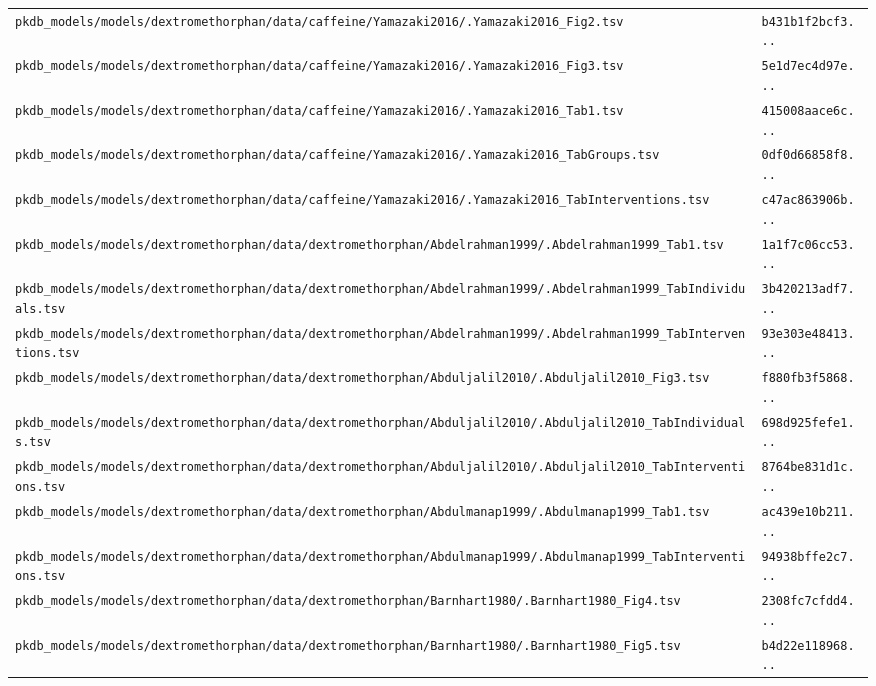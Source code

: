 \documentclass{article}
\begin{document}
\begin{longtable}{ll}
\texttt{pkdb\_models/models/dextromethorphan/data/caffeine/Yamazaki2016/.Yamazaki2016\_Fig2.tsv} & \texttt{b431b1f2bcf3...} \\
\texttt{pkdb\_models/models/dextromethorphan/data/caffeine/Yamazaki2016/.Yamazaki2016\_Fig3.tsv} & \texttt{5e1d7ec4d97e...} \\
\texttt{pkdb\_models/models/dextromethorphan/data/caffeine/Yamazaki2016/.Yamazaki2016\_Tab1.tsv} & \texttt{415008aace6c...} \\
\texttt{pkdb\_models/models/dextromethorphan/data/caffeine/Yamazaki2016/.Yamazaki2016\_TabGroups.tsv} & \texttt{0df0d66858f8...} \\
\texttt{pkdb\_models/models/dextromethorphan/data/caffeine/Yamazaki2016/.Yamazaki2016\_TabInterventions.tsv} & \texttt{c47ac863906b...} \\
\texttt{pkdb\_models/models/dextromethorphan/data/dextromethorphan/Abdelrahman1999/.Abdelrahman1999\_Tab1.tsv} & \texttt{1a1f7c06cc53...} \\
\texttt{pkdb\_models/models/dextromethorphan/data/dextromethorphan/Abdelrahman1999/.Abdelrahman1999\_TabIndividuals.tsv} & \texttt{3b420213adf7...} \\
\texttt{pkdb\_models/models/dextromethorphan/data/dextromethorphan/Abdelrahman1999/.Abdelrahman1999\_TabInterventions.tsv} & \texttt{93e303e48413...} \\
\texttt{pkdb\_models/models/dextromethorphan/data/dextromethorphan/Abduljalil2010/.Abduljalil2010\_Fig3.tsv} & \texttt{f880fb3f5868...} \\
\texttt{pkdb\_models/models/dextromethorphan/data/dextromethorphan/Abduljalil2010/.Abduljalil2010\_TabIndividuals.tsv} & \texttt{698d925fefe1...} \\
\texttt{pkdb\_models/models/dextromethorphan/data/dextromethorphan/Abduljalil2010/.Abduljalil2010\_TabInterventions.tsv} & \texttt{8764be831d1c...} \\
\texttt{pkdb\_models/models/dextromethorphan/data/dextromethorphan/Abdulmanap1999/.Abdulmanap1999\_Tab1.tsv} & \texttt{ac439e10b211...} \\
\texttt{pkdb\_models/models/dextromethorphan/data/dextromethorphan/Abdulmanap1999/.Abdulmanap1999\_TabInterventions.tsv} & \texttt{94938bffe2c7...} \\
\texttt{pkdb\_models/models/dextromethorphan/data/dextromethorphan/Barnhart1980/.Barnhart1980\_Fig4.tsv} & \texttt{2308fc7cfdd4...} \\
\texttt{pkdb\_models/models/dextromethorphan/data/dextromethorphan/Barnhart1980/.Barnhart1980\_Fig5.tsv} & \texttt{b4d22e118968...} \\

\end{longtable}
\end{document}
